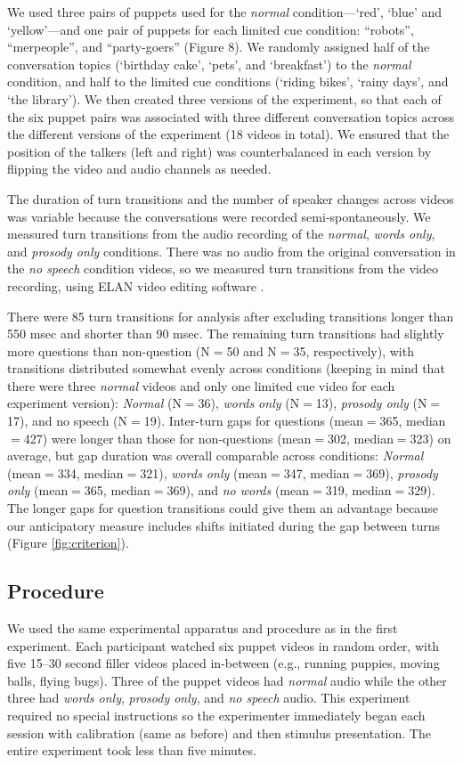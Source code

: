 \documentclass[authoryear, 12pt]{elsarticle}
\begin{document}
We used three pairs of puppets used for the \textit{normal} condition---`red', `blue' and `yellow'---and one pair of puppets for each limited cue condition: ``robots'', ``merpeople'', and ``party-goers'' (Figure 8). We randomly assigned half of the conversation topics (`birthday cake', `pets', and `breakfast') to the \textit{normal} condition, and half to the limited cue conditions (`riding bikes', `rainy days', and `the library'). We then created three versions of the experiment, so that each of the six puppet pairs was associated with three different conversation topics across the different versions of the experiment (18 videos in total). We ensured that the position of the talkers (left and right) was counterbalanced in each version by flipping the video and audio channels as needed.

The duration of turn transitions and the number of speaker changes across videos was variable because the conversations were recorded semi-spontaneously. We measured turn transitions from the audio recording of the \textit{normal}, \textit{words only}, and \textit{prosody only} conditions. There was no audio from the original conversation in the \textit{no speech} condition videos, so we measured turn transitions from the video recording, using ELAN video editing software \citep{ELAN}. 

There were 85 turn transitions for analysis after excluding transitions longer than 550 msec and shorter than 90 msec. The remaining turn transitions had slightly more questions than non-question (N$=$50 and N$=$35, respectively), with transitions distributed somewhat evenly across conditions (keeping in mind that there were three \textit{normal} videos and only one limited cue video for each experiment version): \textit{Normal} (N$=$36), \textit{words only} (N$=$13), \textit{prosody only} (N$=$17), and {no speech} (N$=$19). Inter-turn gaps for questions (mean$=$365, median$=$427) were longer than those for non-questions (mean$=$302, median$=$323) on average, but gap duration was overall comparable across conditions: \textit{Normal} (mean$=$334, median$=$321), \textit{words only} (mean$=$347, median$=$369), \textit{prosody only} (mean$=$365, median$=$369), and \textit{no words} (mean$=$319, median$=$329). The longer gaps for question transitions could give them an advantage because our anticipatory measure includes shifts initiated during the gap between turns (Figure \ref{fig:criterion}).

\subsection{Procedure}
We used the same experimental apparatus and procedure as in the first experiment. Each participant watched six puppet videos in random order, with five 15--30 second filler videos placed in-between (e.g., running puppies, moving balls, flying bugs). Three of the puppet videos had \textit{normal} audio while the other three had \textit{words only}, \textit{prosody only}, and \textit{no speech} audio. This experiment required no special instructions so the experimenter immediately began each session with calibration (same as before) and then stimulus presentation. The entire experiment took less than five minutes.
\end{document}
